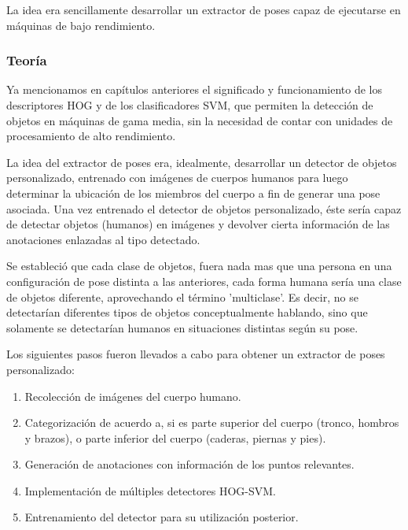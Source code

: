 \documentclass[a4paper,12pt,oneside,spanish]{book}
\begin{document}
La idea era sencillamente desarrollar un extractor de poses capaz de ejecutarse en máquinas de bajo rendimiento.\par

\subsubsection{Teoría}
Ya mencionamos en capítulos anteriores el significado y funcionamiento de los descriptores HOG y de los clasificadores SVM, que permiten la detección de objetos en máquinas de gama media, sin la necesidad de contar con unidades de procesamiento de alto rendimiento.\par

La idea del extractor de poses era, idealmente, desarrollar un detector de objetos personalizado, entrenado con imágenes de cuerpos humanos para luego determinar la ubicación de los miembros del cuerpo a fin de generar una pose asociada. Una vez entrenado el detector de objetos personalizado, éste sería capaz de detectar objetos (humanos) en imágenes y devolver cierta información de las anotaciones enlazadas al tipo detectado. \par

Se estableció que cada clase de objetos, fuera nada mas que una persona en una configuración de pose distinta a las anteriores, cada forma humana sería una clase de objetos diferente, aprovechando el término 'multiclase'. Es decir, no se detectarían diferentes tipos de objetos conceptualmente hablando, sino que solamente se detectarían humanos en situaciones distintas según su pose. \par

Los siguientes pasos fueron llevados a cabo para obtener un extractor de poses personalizado:

\begin{enumerate}
	\item Recolección de imágenes del cuerpo humano.
	\item Categorización de acuerdo a, si es parte superior del cuerpo (tronco, hombros y brazos), o parte inferior del cuerpo (caderas, piernas y pies).
	\item Generación de anotaciones con información de los puntos relevantes.
	\item Implementación de múltiples detectores HOG-SVM.
	\item Entrenamiento del detector para su utilización posterior.
\end{enumerate}	\baselineskip 16pt
\end{document}
